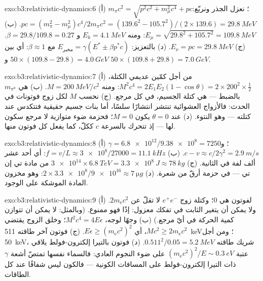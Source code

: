\begin{solution}{exo:b3:relativistic-dynamics:6}
(أ) $m_\pi c^2 = \sqrt{p^2c^2 + m_\mu^2c^4} + pc$؛ نعزل الجذر
ونربّع: $pc = (m_\pi^2 - m_\mu^2)c^4/2m_\pi c^2 =
(139.6^2 - 105.7^2)/(2 \times 139.6) = \qty{29.8}{MeV}$. (ب) $E_\mu =
\sqrt{29.8^2 + 105.7^2} = \qty{109.8}{MeV}$: ومنه $E_k = \qty{4.1}{MeV}$
و $\beta = 29.8/109.8 = 0.27$. (ج) $E_\nu = pc = \qty{29.8}{MeV}$. (د)
بالتعزيز: $E_{\text{مخبر}} = \gamma(E^* \pm \beta p^*c)$ مع $\beta
\approx 1$: أي بين $50 \times (109.8 - 29.8) = \qty{4.0}{GeV}$ و
$50 \times (109.8 + 29.8) = \qty{7.0}{GeV}$.
\end{solution}

\begin{solution}{exo:b3:relativistic-dynamics:7}
(أ) من أجل كمّين عديمي الكتلة، $M^2c^4 = 2E_1E_2(1 - \cos\theta) =
2 \times 200^2 \times \tfrac12$: ومنه $M = \qty{200}{MeV}/c^2$. (ب)
هي $m_{\pi^0}$ بالضبط ---  هي كتلة الجسيم، في
كل مرجع. (ج) نحسب $M$ لكل زوج فوتونات في الحدث:
فالأزواج العشوائية تنتشر انتشارًا سلسًا، أما بنات جسيم حقيقية فتتكدس عند
كتلته --- وهو النتوء. (د) عند $\theta = 0$ يكون $M = 0$؛ فحزمة ضوء
متوازية لا مرجع سكون لها --- إذ تتحرك بالسرعة $c$ ككلّ، كما يفعل كل
فوتون منها.
\end{solution}

\begin{solution}{exo:b3:relativistic-dynamics:8}
(أ) $\gamma = \num{6.8e12}/\num{9.38e8} = 7250$؛ و $c - v \approx
c/2\gamma^2 = \qty{2.9}{m/s}$. (ب) $f = v/L \approx \num{3e8}/27000 =
\qty{11.1}{kHz}$: أي أحد عشر ألف لفة في الثانية. (ج) $\num{3e14}
\times \qty{6.8}{TeV} = \qty{3.3e8}{J} \approx \qty{78}{kg}$ من مادة تي إن تي
--- في حزمة أرقّ من شعرة. (د) $2 \times \num{3.3e8}/\num{9e16} \approx
\qty{7}{\micro g}$: وهو مخزون المادة الموشكة على الوجود.
\end{solution}

\begin{solution}{exo:b3:relativistic-dynamics:9}
(أ)  لفوتون هي $0$؛ وكتلة زوج $e^+e^-$ لا تقلّ عن
$2m_{\text{e}}c^2$. ولا يمكن أن يتغير الثابت في تفكك معزول:
إذًا فهو ممنوع. (وبالمثل: لا يمكن أن تتوازن كمية الحركة في أيّ مرجع.) (ب)
وجهًا لوجه، $M^2c^4 = 4E\epsilon$؛ وخلق الزوج يقتضي $Mc^2 \ge
2m_{\text{e}}c^2$، أي $E\epsilon \ge (m_{\text{e}}c^2)^2$. (ج)
فوتون آخر طاقته \qty{511}{keV}؛ ومن أجل \qty{50}{keV}، شريك طاقته
$0.511^2/0.05 = \qty{5.2}{MeV}$. (د) فوتون بالتيرا إلكترون-فولط يلاقي
عتبة $(m_{\text{e}}c^2)^2/E \sim \qty{0.3}{eV}$ على ضوء النجوم العادي:
فالسماء نفسها تمتصّ أشعة $\gamma$ ذات التيرا إلكترون-فولط على المسافات
الكونية --- فالكون ليس شفافًا عند كل الطاقات.
\end{solution}

